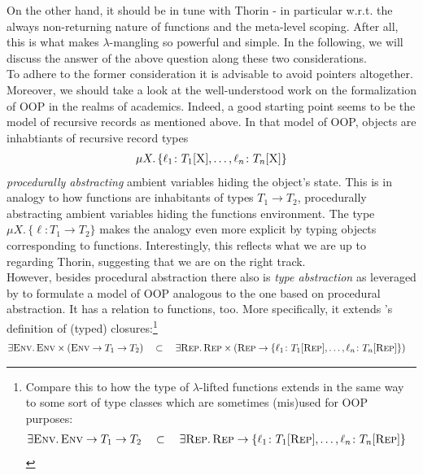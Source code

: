 On the other hand, it should be in tune with Thorin - in particular w.r.t. the always non-returning nature of functions and the meta-level scoping.
After all, this is what makes $\lambda$-mangling so powerful and simple.
In the following, we will discuss the answer of the above question along these two considerations.
\\
To adhere to the former consideration it is advisable to avoid pointers altogether.
Moreover, we should take a look at the well-understood work on the formalization of OOP in the realms of academics.
Indeed, a good starting point seems to be the model of recursive records as mentioned above.
In that model of OOP, objects are inhabtiants of recursive record types
\begin{align*}
  \mu X
  .\,
  \lbrace
    \ell_{1} \colon T_{1}[\textsc{X}],
    \ldots,
    \ell_{n} \colon T_{n}[\textsc{X}]
  \rbrace
\end{align*}
\emph{procedurally abstracting} ambient variables hiding the object's state.
This is in analogy to how functions are inhabitants of types $T_{1} \to T_{2}$, procedurally abstracting ambient variables hiding the functions environment.
The type $\mu X.\, \lbrace \ell \colon T_{1} \to T_{2} \rbrace$ makes the analogy even more explicit by typing objects corresponding to functions.
Interestingly, this reflects what we are up to regarding Thorin, suggesting that we are on the right track.
\\
However, besides procedural abstraction there also is \emph{type abstraction} as leveraged by \citet{PierceTurner92} to formulate a model of OOP analogous to the one based on procedural abstraction.
It has a relation to functions, too.
More specifically, it extends \citet{10.1145/237721.237791}'s definition of (typed) closures:\footnote{
  Compare this to how the type of $\lambda$-lifted functions extends in the same way to some sort of type classes which are sometimes (mis)used for OOP purposes:
\begin{align*}
  \exists
  \textsc{Env}
  .\,
  \textsc{Env} \to T_{1} \to T_{2}
  \quad
  &\subset
  \quad
  \exists
  \textsc{Rep}
  .\,
  \textsc{Rep}
  \to
  \lbrace
    \ell_{1} \colon T_{1}[\textsc{Rep}],
    \ldots,
    \ell_{n} \colon T_{n}[\textsc{Rep}]
  \rbrace
\end{align*}
}
\begin{align*}
  \exists
  \textsc{Env}
  .\,
  \textsc{Env}
  \times
  \left(
    \textsc{Env} \to T_{1} \to T_{2}
  \right)
  \quad
  &\subset
  \quad
  \exists
  \textsc{Rep}
  .\,
  \textsc{Rep}
  \times
  \left(
    \textsc{Rep}
    \to
    \lbrace
      \ell_{1} \colon T_{1}[\textsc{Rep}],
      \ldots,
      \ell_{n} \colon T_{n}[\textsc{Rep}]
    \rbrace
  \right)
\end{align*}
